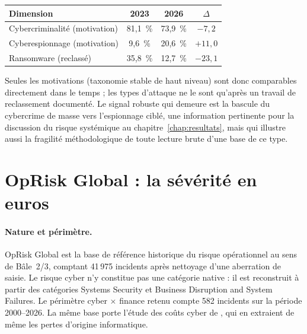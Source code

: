 \begin{center}
\renewcommand{\arraystretch}{1.3}
\begin{tabular}{>{\raggedright}p{4.5cm} c c c}
\toprule
\rowcolor{lightblue}
\textbf{Dimension} & \textbf{2023} & \textbf{2026} & \textbf{$\Delta$} \\
\midrule
Cybercriminalité (motivation) & 81{,}1~\% & 73{,}9~\% & $-7{,}2$ \\
Cyberespionnage (motivation) & 9{,}6~\% & 20{,}6~\% & $+11{,}0$ \\
Ransomware (reclassé) & 35{,}8~\% & 12{,}7~\% & $-23{,}1$ \\
\bottomrule
\end{tabular}
\end{center}

Seules les motivations (taxonomie stable de haut niveau) sont donc
comparables directement dans le temps ; les types d'attaque ne le
sont qu'après un travail de reclassement documenté. Le signal robuste qui
demeure est la bascule du cybercrime de masse vers l'espionnage ciblé, une
information pertinente pour la discussion du risque systémique au chapitre~\ref{chap:resultats},
mais qui illustre aussi la fragilité méthodologique de toute lecture brute
d'une base de ce type.




\section{OpRisk Global : la sévérité en euros}
\label{sec:oprisk}


\paragraph{Nature et périmètre.} OpRisk Global est la base de référence
historique du risque opérationnel au sens de Bâle~2/3, comptant
41\,975 incidents après nettoyage d'une aberration de saisie. Le
risque cyber n'y constitue pas une catégorie native : il est reconstruit à
partir des catégories \og Systems Security\fg{} et \og Business Disruption and
System Failures\fg{}. Le périmètre cyber $\times$ finance retenu compte
582 incidents sur la période 2000--2026. La même base porte l'étude des coûts cyber de
\citet{elingwirfs2019}, qui en extraient de même les pertes d'origine informatique.

